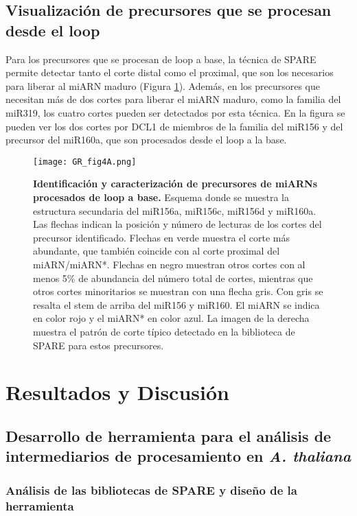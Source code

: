 \subsection{Visualización de precursores que se procesan desde el loop}

Para los precursores que se procesan de loop a base, la técnica de SPARE permite detectar tanto el corte distal como el proximal, que son los necesarios para liberar al miARN maduro (Figura \ref{fig:GR_fig4A}).
Además, en los precursores que necesitan más de dos cortes para liberar el miARN maduro, como la familia del miR319, los cuatro cortes pueden ser detectados por esta técnica.
En la figura se pueden ver los dos cortes por DCL1 de miembros de la familia del miR156 y del precursor del miR160a, que son procesados desde el loop a la base.

\begin{figure}[htbp!] 
    \centering    
    \texttt{[image: GR\_fig4A.png]}
    \caption[Identificación y caracterización de precursores de miARNs procesados de loop a base]{
    \textbf{Identificación y caracterización de precursores de miARNs procesados de loop a base.}
    Esquema donde se muestra la estructura secundaria del miR156a, miR156c, miR156d y miR160a.
    Las flechas indican la posición y número de lecturas de los cortes del precursor identificado.
    Flechas en verde muestra el corte más abundante, que también coincide con al corte proximal del miARN/miARN*.
    Flechas en negro muestran otros cortes con al menos 5\% de abundancia del número total de cortes, mientras que otros cortes minoritarios se muestran con una flecha gris.
    Con gris se resalta el stem de arriba del miR156 y miR160. El miARN se indica en color rojo y el miARN* en color azul.
    La imagen de la derecha muestra el patrón de corte típico detectado en la biblioteca de SPARE para estos precursores.
}
    \label{fig:GR_fig4A}
\end{figure}


\section{Resultados y Discusión}

\subsection{Desarrollo de herramienta para el análisis de intermediarios de procesamiento en \textit{A. thaliana}}

\subsubsection{Análisis de las bibliotecas de SPARE y diseño de la herramienta}

